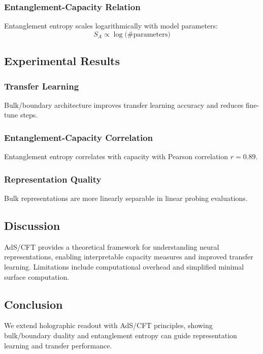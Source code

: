 \documentclass{article}
\numberwithin{equation}{section}
\begin{document}
\subsubsection{Entanglement-Capacity Relation}
Entanglement entropy scales logarithmically with model parameters:
\[
S_A \propto \log\!\big(\#\text{parameters}\big)
\]

\subsection{Experimental Results}
\subsubsection{Transfer Learning}
Bulk/boundary architecture improves transfer learning accuracy and reduces fine-tune steps.

\subsubsection{Entanglement-Capacity Correlation}
Entanglement entropy correlates with capacity with Pearson correlation $r = 0.89$.

\subsubsection{Representation Quality}
Bulk representations are more linearly separable in linear probing evaluations.

\subsection{Discussion}
AdS/CFT provides a theoretical framework for understanding neural representations, enabling interpretable capacity measures and improved transfer learning. Limitations include computational overhead and simplified minimal surface computation.

\subsection{Conclusion}
We extend holographic readout with AdS/CFT principles, showing bulk/boundary duality and entanglement entropy can guide representation learning and transfer performance.
\end{document}
